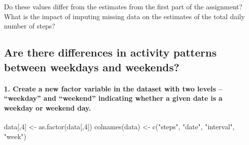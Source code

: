 \documentclass[
]{article}
\newenvironment{Shaded}{\begin{snugshade}}{\end{snugshade}}
\newcommand{\DecValTok}[1]{\textcolor[rgb]{0.00,0.00,0.81}{#1}}
\newcommand{\FunctionTok}[1]{\textcolor[rgb]{0.00,0.00,0.00}{#1}}
\newcommand{\NormalTok}[1]{#1}
\newcommand{\OtherTok}[1]{\textcolor[rgb]{0.56,0.35,0.01}{#1}}
\newcommand{\SpecialCharTok}[1]{\textcolor[rgb]{0.00,0.00,0.00}{#1}}
\newcommand{\StringTok}[1]{\textcolor[rgb]{0.31,0.60,0.02}{#1}}
\begin{document}
Do these values differ from the estimates from the first part of the
assignment? What is the impact of imputing missing data on the estimates
of the total daily number of steps?

\hypertarget{are-there-differences-in-activity-patterns-between-weekdays-and-weekends}{%
\subsection{Are there differences in activity patterns between weekdays
and
weekends?}\label{are-there-differences-in-activity-patterns-between-weekdays-and-weekends}}

\begin{Shaded}
\end{Shaded}

\hypertarget{create-a-new-factor-variable-in-the-dataset-with-two-levels-weekday-and-weekend-indicating-whether-a-given-date-is-a-weekday-or-weekend-day.}{%
\paragraph{1. Create a new factor variable in the dataset with two
levels -- ``weekday'' and ``weekend'' indicating whether a given date is
a weekday or weekend
day.}\label{create-a-new-factor-variable-in-the-dataset-with-two-levels-weekday-and-weekend-indicating-whether-a-given-date-is-a-weekday-or-weekend-day.}}

\begin{Shaded}
\begin{Highlighting}[]
\NormalTok{data[,}\DecValTok{4}\NormalTok{] }\OtherTok{\textless{}{-}} \FunctionTok{as.factor}\NormalTok{(data[,}\DecValTok{4}\NormalTok{])}
\FunctionTok{colnames}\NormalTok{(data) }\OtherTok{\textless{}{-}} \FunctionTok{c}\NormalTok{(}\StringTok{"steps"}\NormalTok{, }\StringTok{"date"}\NormalTok{, }\StringTok{"interval"}\NormalTok{, }\StringTok{"week"}\NormalTok{)}
\end{Highlighting}
\end{Shaded}
\end{document}
